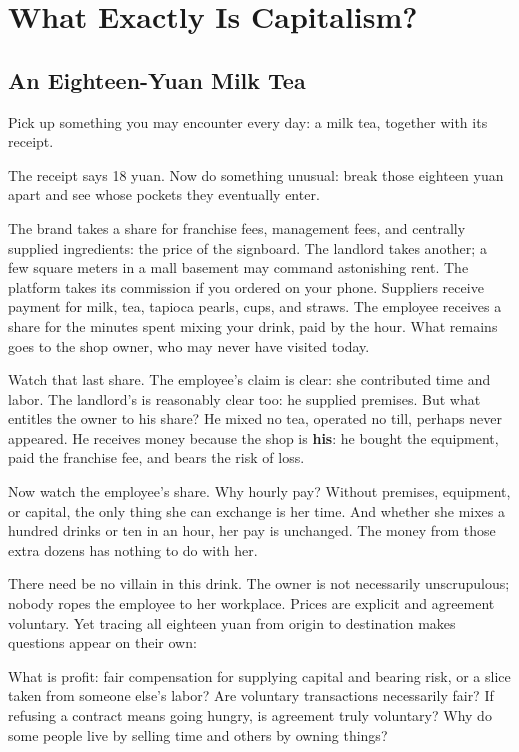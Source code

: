 \chapter{What Exactly Is Capitalism?}
\section{An Eighteen-Yuan Milk Tea}
Pick up something you may encounter every day: a milk tea, together with its receipt.

The receipt says 18 yuan. Now do something unusual: break those eighteen yuan apart and see whose pockets they eventually enter.

The brand takes a share for franchise fees, management fees, and centrally supplied ingredients: the price of the signboard. The landlord takes another; a few square meters in a mall basement may command astonishing rent. The platform takes its commission if you ordered on your phone. Suppliers receive payment for milk, tea, tapioca pearls, cups, and straws. The employee receives a share for the minutes spent mixing your drink, paid by the hour. What remains goes to the shop owner, who may never have visited today.

Watch that last share. The employee's claim is clear: she contributed time and labor. The landlord's is reasonably clear too: he supplied premises. But what entitles the owner to his share? He mixed no tea, operated no till, perhaps never appeared. He receives money because the shop is \textbf{his}: he bought the equipment, paid the franchise fee, and bears the risk of loss.

Now watch the employee's share. Why hourly pay? Without premises, equipment, or capital, the only thing she can exchange is her time. And whether she mixes a hundred drinks or ten in an hour, her pay is unchanged. The money from those extra dozens has nothing to do with her.

There need be no villain in this drink. The owner is not necessarily unscrupulous; nobody ropes the employee to her workplace. Prices are explicit and agreement voluntary. Yet tracing all eighteen yuan from origin to destination makes questions appear on their own:

What is profit: fair compensation for supplying capital and bearing risk, or a slice taken from someone else's labor? Are voluntary transactions necessarily fair? If refusing a contract means going hungry, is agreement truly voluntary? Why do some people live by selling time and others by owning things?

